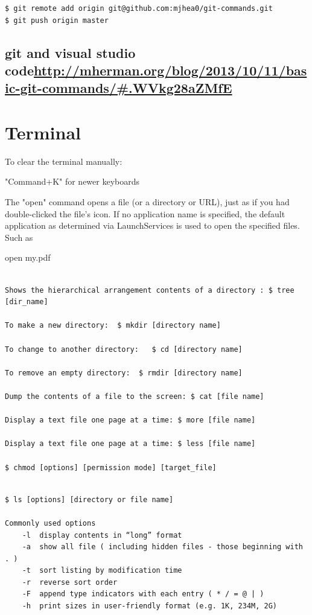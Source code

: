 \begin{verbatim}
$ git remote add origin git@github.com:mjhea0/git-commands.git
$ git push origin master
\end{verbatim}



\subsection{git and visual studio code\url{http://mherman.org/blog/2013/10/11/basic-git-commands/#.WVkg28aZMfE}}








\section{Terminal}

To clear the terminal manually:


"Command+K"  for newer keyboards


The "open" command opens a file (or a directory or URL), just as if you had double-clicked the file's icon. If no application name is specified, the default application as determined via LaunchServices is used to open the specified files. Such as

open my.pdf

\begin{verbatim}

Shows the hierarchical arrangement contents of a directory : $ tree [dir_name]

To make a new directory:  $ mkdir [directory name]

To change to another directory:   $ cd [directory name]

To remove an empty directory:  $ rmdir [directory name]

Dump the contents of a file to the screen: $ cat [file name]

Display a text file one page at a time: $ more [file name]

Display a text file one page at a time: $ less [file name]

$ chmod [options] [permission mode] [target_file]


\end{verbatim}

\begin{verbatim}
$ ls [options] [directory or file name]

Commonly used options
	-l	display contents in “long” format
	-a	show all file ( including hidden files - those beginning with . )
	-t	sort listing by modification time
	-r	reverse sort order
	-F	append type indicators with each entry ( * / = @ | )
	-h	print sizes in user-friendly format (e.g. 1K, 234M, 2G)

\end{verbatim}

